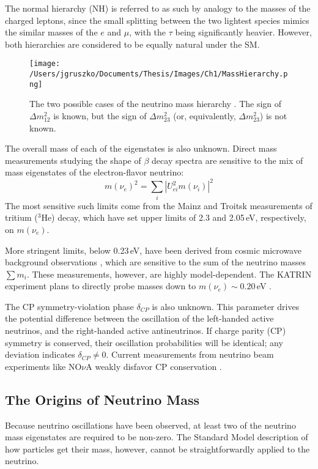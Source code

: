 The normal hierarchy (NH) is referred to as such by analogy to the masses of the charged leptons, since the small splitting between the two lightest species mimics the similar masses of the $e$ and $\mu$, with the $\tau$ being significantly heavier. However, both hierarchies are considered to be equally natural under the SM. 

\begin{figure}[]
\hfil \texttt{[image: /Users/jgruszko/Documents/Thesis/Images/Ch1/MassHierarchy.png]} \hfil
\caption{The two possible cases of the neutrino mass hierarchy \cite{Hewett2012}. The sign of $\Delta m_{12}^2$ is known, but the sign of $\Delta m_{23}^2$ (or, equivalently, $\Delta m_{23}^2$) is not known.}
\label{mass_hierarchy}
\end{figure}

The overall mass of each of the eigenstates is also unknown. Direct mass measurements studying the shape of $\beta$ decay spectra are sensitive to the mix of mass eigenstates of the electron-flavor neutrino: 
$$m(\nu_e)^2 = \sum_i \left|U^2_{ei}m(\nu_i)\right|^2 $$
The most sensitive such limits come from the Mainz \cite{Mainz2005} and Troitsk \cite{Troitsk2011} measurements of tritium ($^3$He) decay, which have set upper limits of 2.3 and 2.05\,eV, respectively, on $m(\nu_e)$. 

More stringent limits, below 0.23\,eV, have been derived from cosmic microwave background observations \cite{PlanckXVI_2013}, which are sensitive to the sum of the neutrino masses $\sum m_i$. These measurements, however, are highly model-dependent. The KATRIN experiment plans to directly probe masses down to $m(\nu_e) \sim 0.20$\,eV \cite{KATRIN2015}. 

The CP symmetry-violation phase $\delta_{CP}$ is also unknown. This parameter drives the potential difference between the oscillation of the left-handed active neutrinos, and the right-handed active antineutrinos. If charge parity (CP) symmetry is conserved, their oscillation probabilities will be identical; any deviation indicates $\delta_{CP} \neq 0$. Current measurements from neutrino beam experiments like NO$\nu$A weakly disfavor CP conservation \cite{NOvA2016}. 

\subsection{The Origins of Neutrino Mass}
Because neutrino oscillations have been observed, at least two of the neutrino mass eigenstates are required to be non-zero. The Standard Model description of how particles get their mass, however, cannot be straightforwardly applied to the neutrino. 

